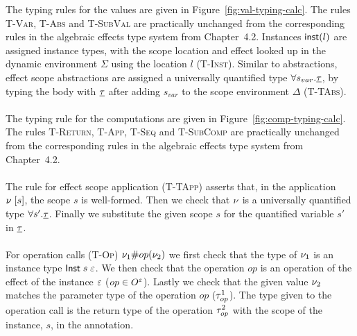 {The typing rules for the values are given in Figure~\ref{fig:val-typing-calc}.
The rules \textsc{T-Var}, \textsc{T-Abs} and \textsc{T-SubVal} are practically unchanged from the corresponding rules in the algebraic effects type system from Chapter~4.2.
Instances $\mathsf{inst}(l)$ are assigned instance types, with the scope location and effect looked up in the dynamic environment $\Sigma$ using the location $l$ (\textsc{T-Inst}).
Similar to abstractions, effect scope abstractions are assigned a universally quantified type $\forall s_{var} . \underline{\tau}$, by typing the body with $\underline{\tau}$ after adding $s_{var}$ to the scope environment $\Delta$ (\textsc{T-TAbs}).
\\\\
The typing rule for the computations are given in Figure~\ref{fig:comp-typing-calc}.
The rules \textsc{T-Return}, \textsc{T-App}, \textsc{T-Seq} and \textsc{T-SubComp} are practically unchanged from the corresponding rules in the algebraic effects type system from Chapter~4.2.
\\\\
The rule for effect scope application (\textsc{T-TApp}) asserts that, in the application $\nu \; [ s ]$, the scope $s$ is well-formed.
Then we check that $\nu$ is a universally quantified type $\forall s' . \underline{\tau}$.
Finally we substitute the given scope $s$ for the quantified variable $s'$ in $\underline{\tau}$.
\\\\
For operation calls (\textsc{T-Op}) $\nu_1 \# op(\nu_2)$ we first check that the type of $\nu_1$ is an instance type $\mathsf{Inst} \; s \; \varepsilon$.
We then check that the operation $op$ is an operation of the effect of the instance $\varepsilon$ ($op \in O^{\varepsilon}$).
Lastly we check that the given value $\nu_2$ matches the parameter type of the operation $op$ ($\tau^1_{op}$).
The type given to the operation call is the return type of the operation $\tau^2_{op}$ with the scope of the instance, $s$, in the annotation.

}
